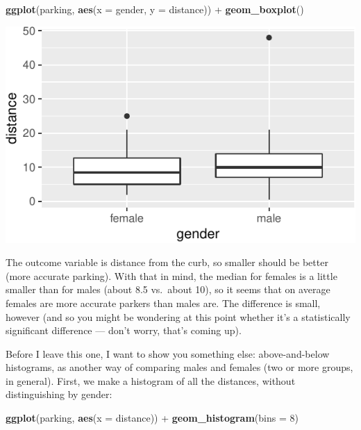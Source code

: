 \documentclass[]{tufte-book}
\newenvironment{Shaded}{}{}
\newcommand{\DataTypeTok}[1]{\textcolor[rgb]{0.56,0.13,0.00}{#1}}
\newcommand{\DecValTok}[1]{\textcolor[rgb]{0.25,0.63,0.44}{#1}}
\newcommand{\KeywordTok}[1]{\textcolor[rgb]{0.00,0.44,0.13}{\textbf{#1}}}
\newcommand{\NormalTok}[1]{#1}
\newcommand{\OperatorTok}[1]{\textcolor[rgb]{0.40,0.40,0.40}{#1}}
\newcommand{\StringTok}[1]{\textcolor[rgb]{0.25,0.44,0.63}{#1}}
\theoremstyle{definition}
\theoremstyle{definition}
\theoremstyle{definition}
\theoremstyle{remark}
\begin{document}
\begin{Shaded}
\begin{Highlighting}[]
\KeywordTok{ggplot}\NormalTok{(parking, }\KeywordTok{aes}\NormalTok{(}\DataTypeTok{x =}\NormalTok{ gender, }\DataTypeTok{y =}\NormalTok{ distance)) }\OperatorTok{+}\StringTok{ }
\StringTok{    }\KeywordTok{geom_boxplot}\NormalTok{()}
\end{Highlighting}
\end{Shaded}

\includegraphics{05-two-sample-inference_files/figure-latex/unnamed-chunk-18-1}

The outcome variable is distance from the curb, so smaller should be
better (more accurate parking). With that in mind, the median for
females is a little smaller than for males (about 8.5 vs.~about 10), so
it seems that on average females are more accurate parkers than males
are. The difference is small, however (and so you might be wondering at
this point whether it's a statistically significant difference --- don't
worry, that's coming up).

Before I leave this one, I want to show you something else:
above-and-below histograms, as another way of comparing males and
females (two or more groups, in general). First, we make a histogram of
all the distances, without distinguishing by gender:

\begin{Shaded}
\begin{Highlighting}[]
\KeywordTok{ggplot}\NormalTok{(parking, }\KeywordTok{aes}\NormalTok{(}\DataTypeTok{x =}\NormalTok{ distance)) }\OperatorTok{+}\StringTok{ }\KeywordTok{geom_histogram}\NormalTok{(}\DataTypeTok{bins =} \DecValTok{8}\NormalTok{)}
\end{Highlighting}
\end{Shaded}
\end{document}
